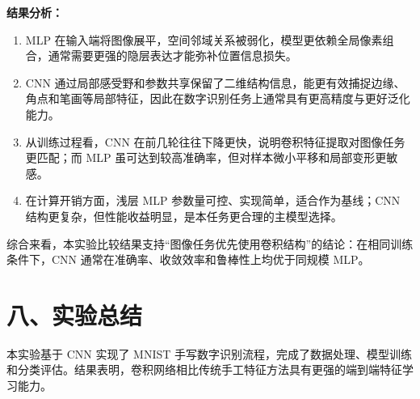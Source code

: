 \documentclass[12pt,a4paper]{ctexart}
\begin{document}
\textbf{结果分析：}
\begin{enumerate}
\item MLP 在输入端将图像展平，空间邻域关系被弱化，模型更依赖全局像素组合，通常需要更强的隐层表达才能弥补位置信息损失。
\item CNN 通过局部感受野和参数共享保留了二维结构信息，能更有效捕捉边缘、角点和笔画等局部特征，因此在数字识别任务上通常具有更高精度与更好泛化能力。
\item 从训练过程看，CNN 在前几轮往往下降更快，说明卷积特征提取对图像任务更匹配；而 MLP 虽可达到较高准确率，但对样本微小平移和局部变形更敏感。
\item 在计算开销方面，浅层 MLP 参数量可控、实现简单，适合作为基线；CNN 结构更复杂，但性能收益明显，是本任务更合理的主模型选择。
\end{enumerate}

综合来看，本实验比较结果支持“图像任务优先使用卷积结构”的结论：在相同训练条件下，CNN 通常在准确率、收敛效率和鲁棒性上均优于同规模 MLP。

\section*{八、实验总结}
本实验基于 CNN 实现了 MNIST 手写数字识别流程，完成了数据处理、模型训练和分类评估。结果表明，卷积网络相比传统手工特征方法具有更强的端到端特征学习能力。
\end{document}
